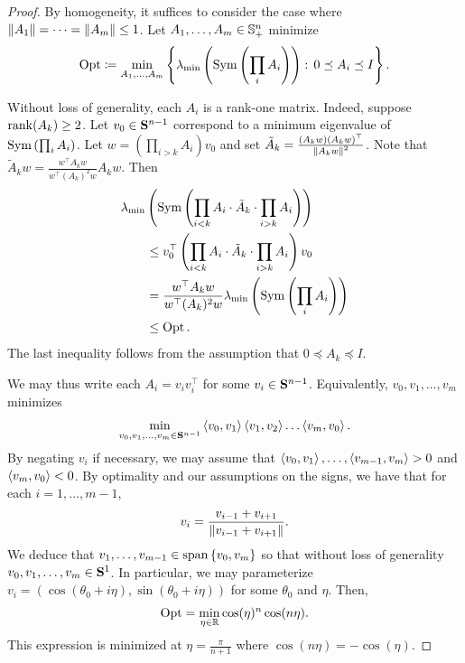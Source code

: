 \documentclass{article}
\begin{document}
\begin{proof}
By homogeneity, it suffices to consider the case where $\norm{A_1}=\dots=\norm{A_m} \leq 1$.
Let $A_1,\dots,A_m\in\S^n_+$ minimize
\begin{align*}
\Opt\coloneqq \min_{A_1,\dots,A_m}\set{\lambda_{\min}\left(\Sym\left(\prod_i A_i\right)\right):\, 0\preceq A_i \preceq I}.
\end{align*}

Without loss of generality, each $A_i$ is a rank-one matrix. Indeed, suppose $\rank(A_k)\geq 2$. Let $v_0\in\bS^{n-1}$ correspond to a minimum eigenvalue of $\Sym\left(\prod_i A_i\right)$. Let $w = (\prod_{i>k} A_i) v_0$ and set $\tilde A_k = \frac{(A_kw)(A_kw)^\top}{\norm{A_k w}^2}$.
Note that $\tilde A_k w = \frac{w^\top A_k w}{w^\top (A_k)^2 w}A_kw$.
Then
\begin{align*}
&\lambda_{\min}\left(\Sym\left(\prod_{i<k} A_i \cdot \tilde A_k \cdot\prod_{i>k} A_i \right)\right)\\
&\qquad\leq v_0^\top \left(\prod_{i<k} A_i \cdot \tilde A_k \cdot\prod_{i>k} A_i \right) v_0\\
&\qquad = \frac{w^\top A_k w}{w^\top (A_k)^2 w} \lambda_{\min}\left(\Sym\left(\prod_i A_i\right)\right)\\
&\qquad \leq \Opt. 
\end{align*}
The last inequality follows from the assumption that $0\preceq A_k \preceq I$.

We may thus write each $A_i=v_iv_i^\top$ for some $v_i\in\bS^{n-1}$. Equivalently, $v_0,v_1,\dots,v_m$ minimizes
\begin{align*}
\min_{v_0,v_1,\dots,v_m\in\bS^{n-1}} \ip{v_0,v_1}\ip{v_1,v_2}\dots\ip{v_m,v_0}.
\end{align*}
By negating $v_i$ if necessary, we may assume that $\ip{v_0, v_1}, \dots, \ip{v_{m-1}, v_m} > 0$ and $\ip{v_m, v_0} <0$.
By optimality and our assumptions on the signs, we have that for each $i = 1,\dots, m-1$,
\begin{align*}
v_i = \frac{v_{i-1} + v_{i+1}}{\norm{v_{i-1}+ v_{i+1}}}.
\end{align*}
We deduce that $v_1,\dots, v_{m-1} \in \spann\set{v_0, v_m}$ so that without loss of generality $v_0,v_1,\dots, v_m \in\bS^{1}$.
In particular, we may parameterize $v_i = (\cos(\theta_0 + i \eta), \sin(\theta_0 + i \eta))$ for some $\theta_0$ and $\eta$. Then,
\begin{align*}
\Opt = \min_{\eta\in\R} \cos(\eta)^n\cos(n\eta).
\end{align*}
This expression is minimized at $\eta = \frac{\pi}{n+1}$ where $\cos(n\eta) = -\cos(\eta)$.
\end{proof}

\end{document}
